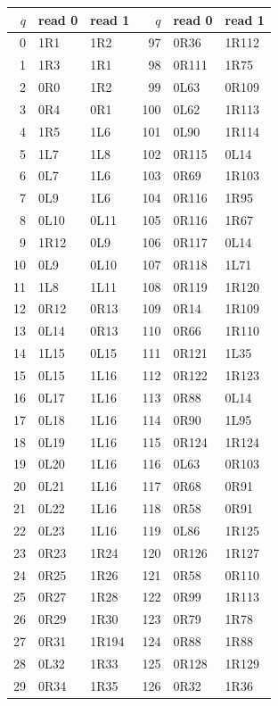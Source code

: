 \small\ttfamily
\begin{longtable}{@{}rll@{\hspace{2.5em}}rll@{}}
\toprule $q$ & read 0 & read 1 & $q$ & read 0 & read 1 \\
\midrule\endhead
0 & 1R1 & 1R2 & 97 & 0R36 & 1R112 \\
1 & 1R3 & 1R1 & 98 & 0R111 & 1R75 \\
2 & 0R0 & 1R2 & 99 & 0L63 & 0R109 \\
3 & 0R4 & 0R1 & 100 & 0L62 & 1R113 \\
4 & 1R5 & 1L6 & 101 & 0L90 & 1R114 \\
5 & 1L7 & 1L8 & 102 & 0R115 & 0L14 \\
6 & 0L7 & 1L6 & 103 & 0R69 & 1R103 \\
7 & 0L9 & 1L6 & 104 & 0R116 & 1R95 \\
8 & 0L10 & 0L11 & 105 & 0R116 & 1R67 \\
9 & 1R12 & 0L9 & 106 & 0R117 & 0L14 \\
10 & 0L9 & 0L10 & 107 & 0R118 & 1L71 \\
11 & 1L8 & 1L11 & 108 & 0R119 & 1R120 \\
12 & 0R12 & 0R13 & 109 & 0R14 & 1R109 \\
13 & 0L14 & 0R13 & 110 & 0R66 & 1R110 \\
14 & 1L15 & 0L15 & 111 & 0R121 & 1L35 \\
15 & 0L15 & 1L16 & 112 & 0R122 & 1R123 \\
16 & 0L17 & 1L16 & 113 & 0R88 & 0L14 \\
17 & 0L18 & 1L16 & 114 & 0R90 & 1L95 \\
18 & 0L19 & 1L16 & 115 & 0R124 & 1R124 \\
19 & 0L20 & 1L16 & 116 & 0L63 & 0R103 \\
20 & 0L21 & 1L16 & 117 & 0R68 & 0R91 \\
21 & 0L22 & 1L16 & 118 & 0R58 & 0R91 \\
22 & 0L23 & 1L16 & 119 & 0L86 & 1R125 \\
23 & 0R23 & 1R24 & 120 & 0R126 & 1R127 \\
24 & 0R25 & 1R26 & 121 & 0R58 & 0R110 \\
25 & 0R27 & 1R28 & 122 & 0R99 & 1R113 \\
26 & 0R29 & 1R30 & 123 & 0R79 & 1R78 \\
27 & 0R31 & 1R194 & 124 & 0R88 & 1R88 \\
28 & 0L32 & 1R33 & 125 & 0R128 & 1R129 \\
29 & 0R34 & 1R35 & 126 & 0R32 & 1R36 \\

\end{longtable}
